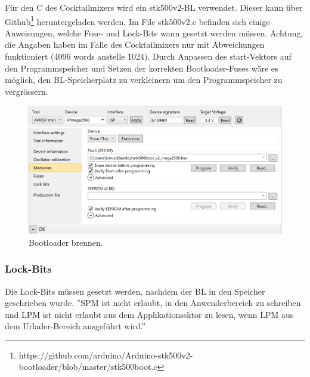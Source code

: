 Für den \textmu C des Cocktailmixers wird ein stk500v2-BL verwendet. Dieser kann über Github\footnote{https://github.com/arduino/Arduino-stk500v2-bootloader/blob/master/stk500boot.c
} heruntergeladen werden. Im File stk500v2.c befinden sich einige Anweisungen, welche Fuse- und Lock-Bits wann gesetzt werden müssen. Achtung, die Angaben haben im Falle des Cocktailmixers nur mit Abweichungen funktioniert (4096 words anstelle 1024). Durch Anpassen des start-Vektors auf den Programmspeicher und Setzen der korrekten Bootloader-Fuses wäre es möglich, den BL-Speicherplatz zu verkleinern um den Programmspeicher zu vergrössern.



\begin{figure}[H]
	\centering
	\includegraphics[width=\textwidth]{graphics/AtmelStudio_Program_Bootloader}
	\caption{Bootloader brennen.}
	\label{fig:AtmelStudio_Program_Bootloader}
\end{figure}

\subsubsection{Lock-Bits}

Die Lock-Bits müssen gesetzt werden, nachdem der BL in den Speicher geschrieben wurde. ''SPM ist nicht erlaubt, in den Anwenderbereich zu schreiben und LPM ist nicht erlaubt aus dem Applikationssktor zu lesen, wenn LPM aus dem Urlader-Bereich ausgeführt wird.''

